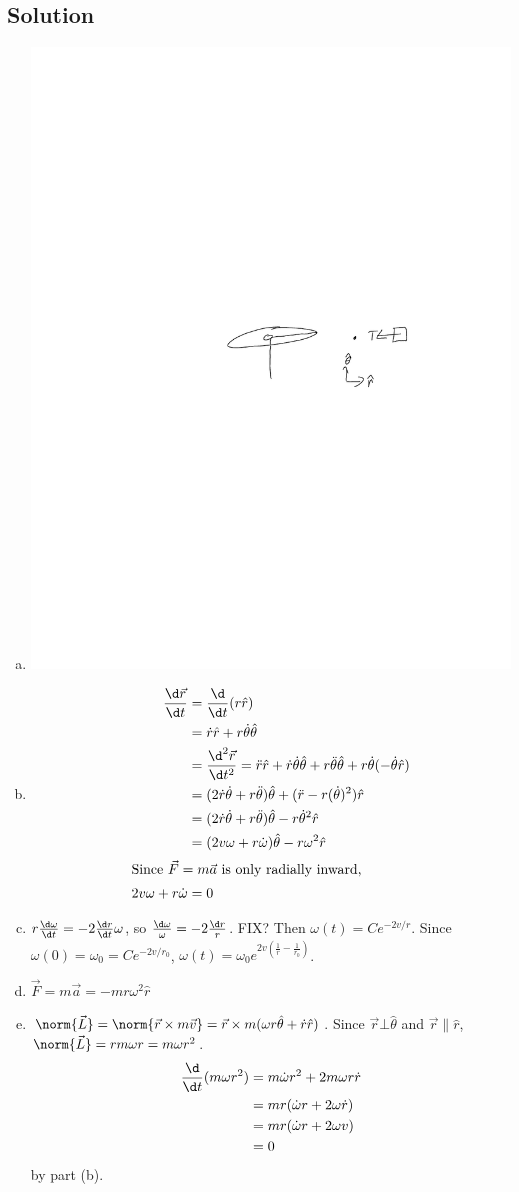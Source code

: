 \documentclass[solutions]{esg8012pset}
\begin{document}
\subsection*{Solution}
  \begin{enumerate}[a)]
    \item \includegraphics[width=.5\textwidth]{2009-10-02_Diagram_5_0}
    \item \begin{align*}
      \frac{\d \vec r}{\d t} & = \frac{\d}{\d t}(r \hat r) \\
       & = \dot r \hat r + r\dot\theta \hat\theta \\
       & = \frac{\d^2 \vec r}{\d t^2} = \ddot r\hat r + \dot r\dot\theta \hat \theta + r \ddot\theta\hat\theta + r\dot\theta(-\dot\theta\hat r) \\
       & = (2\dot r\dot\theta + r\ddot\theta)\hat\theta +(\ddot r - r(\dot\theta)^2)\hat r \\
       & = (2\dot r\dot\theta + r\ddot\theta)\hat\theta - r\dot\theta^2\hat r \\
       & = (2v\omega + r\dot\omega)\hat\theta - r\omega^2\hat r \\
       \intertext{Since $\vec F = m \vec a$ is only radially inward,}
       2v\omega + r\dot \omega & = 0
    \end{align*}
    \item $r\frac{\d \omega}{\d t} = -2 \frac{\d r}{\d t}\omega$, so $\frac{\d \omega}{\omega} = -2\frac{\d r}{r}$.  FIX? Then $\omega(t) = C e^{-2v / r}$.   Since $\omega(0) = \omega_0 = Ce^{-2v/r_0}$, $\omega(t) = \omega_0 e^{2v\left(\frac{1}{r} - \frac{1}{r_0}\right)}$.
    \item $\vec F = m\vec a = -mr\omega^2\hat r$
    \item $\norm{\vec L} = \norm{\vec r\times m \vec v} = \vec r\times m(\omega r\hat\theta + \dot r\hat r)$.  Since $\vec r \bot \hat\theta$ and $\vec r \| \hat r$, $\norm{\vec L} = rm\omega r = m\omega r^2$.  \begin{align*}
     \frac{\d }{\d t}(m \omega r^2) & = m\dot\omega r^2 + 2m\omega r\dot r \\
      & = m r(\dot\omega r + 2\omega\dot r) \\
      & = m r(\dot \omega r + 2\omega v) \\
      & = 0
      \end{align*} by part (b).
  \end{enumerate}
\end{document}
